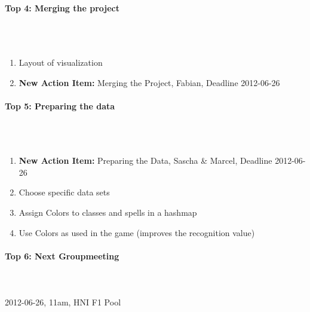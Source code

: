 \documentclass{scrartcl}
\begin{document}
\paragraph{Top 4: Merging the project}
\hfill \\ \hfill \\
\begin {enumerate}
\item Layout of visualization
\item \textbf{New Action Item:} Merging the Project, Fabian, Deadline 2012-06-26
\end {enumerate}

\paragraph{Top 5: Preparing the data}
\hfill \\ \hfill \\
\begin {enumerate}
\item \textbf{New Action Item:} Preparing the Data, Sascha \& Marcel, Deadline 2012-06-26
\item Choose specific data sets
\item Assign Colors to classes and spells in a hashmap
\item Use Colors as used in the game (improves the recognition value)
\end {enumerate}

\paragraph{Top 6: Next Groupmeeting}
\hfill \\ \hfill \\
2012-06-26, 11am, HNI F1 Pool
\end{document}
